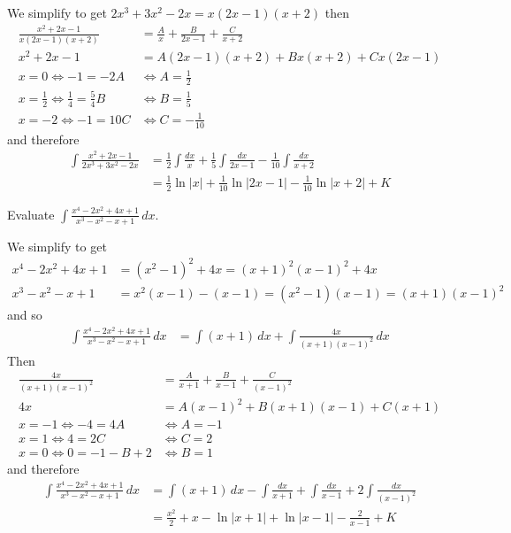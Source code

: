\begin{solution}
    We simplify to get \(2x^3+3x^2-2x=x(2x-1)(x+2)\) then
    \begin{align*}
        \frac{x^2+2x-1}{x(2x-1)(x+2)} &=
        \frac{A}{x}+\frac{B}{2x-1}+\frac{C}{x+2} \\
        x^2+2x-1 &= A(2x-1)(x+2)+Bx(x+2)+Cx(2x-1) \\
        x=0\iff -1=-2A &\iff A=\frac{1}{2} \\
        x=\frac{1}{2}\iff \frac{1}{4}=\frac{5}{4}B &\iff B=\frac{1}{5} \\
        x=-2\iff -1=10C &\iff C=-\frac{1}{10}
    \end{align*}
    and therefore
    \begin{align*}
        \int\frac{x^2+2x-1}{2x^3+3x^2-2x}
        &= \frac{1}{2}\int\frac{dx}{x}+\frac{1}{5}\int\frac{dx}{2x-1}
        -\frac{1}{10}\int\frac{dx}{x+2} \\
        &= \frac{1}{2}\ln|x|+\frac{1}{10}\ln|2x-1|
        -\frac{1}{10}\ln|x+2|+K
    \end{align*}
\end{solution}
\begin{problem}
    Evaluate \(\displaystyle{\int\frac{x^4-2x^2+4x+1}{x^3-x^2-x+1}\,dx}\).
\end{problem}
\begin{solution}
    We simplify to get
    \begin{align*}
        x^4-2x^2+4x+1 &=(x^2-1)^2+4x=(x+1)^2(x-1)^2+4x \\
        x^3-x^2-x+1 &= x^2(x-1)-(x-1)=(x^2-1)(x-1)=(x+1)(x-1)^2
    \end{align*}
    and so
    \begin{align*}
        \int\frac{x^4-2x^2+4x+1}{x^3-x^2-x+1}\,dx
        &= \int(x+1)\,dx+\int\frac{4x}{(x+1)(x-1)^2}\,dx
    \end{align*}
    Then
    \begin{align*}
        \frac{4x}{(x+1)(x-1)^2} &=
        \frac{A}{x+1}+\frac{B}{x-1}+\frac{C}{(x-1)^2} \\
        4x &= A(x-1)^2+B(x+1)(x-1)+C(x+1) \\
        x=-1\iff -4=4A &\iff A=-1 \\ x=1\iff 4=2C &\iff C=2 \\
        x=0\iff 0=-1-B+2 &\iff B=1
    \end{align*}
    and therefore
    \begin{align*}
        \int\frac{x^4-2x^2+4x+1}{x^3-x^2-x+1}\,dx
        &= \int(x+1)\,dx-\int\frac{dx}{x+1}+\int\frac{dx}{x-1}
        +2\int\frac{dx}{(x-1)^2} \\
        &= \frac{x^2}{2}+x-\ln|x+1|+\ln|x-1|-\frac{2}{x-1}+K
    \end{align*}
\end{solution}
